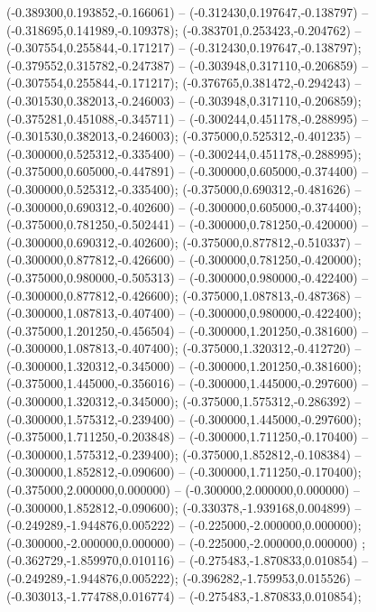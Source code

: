  (-0.389300,0.193852,-0.166061) -- (-0.312430,0.197647,-0.138797) -- (-0.318695,0.141989,-0.109378);
 (-0.383701,0.253423,-0.204762) -- (-0.307554,0.255844,-0.171217) -- (-0.312430,0.197647,-0.138797);
 (-0.379552,0.315782,-0.247387) -- (-0.303948,0.317110,-0.206859) -- (-0.307554,0.255844,-0.171217);
 (-0.376765,0.381472,-0.294243) -- (-0.301530,0.382013,-0.246003) -- (-0.303948,0.317110,-0.206859);
 (-0.375281,0.451088,-0.345711) -- (-0.300244,0.451178,-0.288995) -- (-0.301530,0.382013,-0.246003);
 (-0.375000,0.525312,-0.401235) -- (-0.300000,0.525312,-0.335400) -- (-0.300244,0.451178,-0.288995);
 (-0.375000,0.605000,-0.447891) -- (-0.300000,0.605000,-0.374400) -- (-0.300000,0.525312,-0.335400);
 (-0.375000,0.690312,-0.481626) -- (-0.300000,0.690312,-0.402600) -- (-0.300000,0.605000,-0.374400);
 (-0.375000,0.781250,-0.502441) -- (-0.300000,0.781250,-0.420000) -- (-0.300000,0.690312,-0.402600);
 (-0.375000,0.877812,-0.510337) -- (-0.300000,0.877812,-0.426600) -- (-0.300000,0.781250,-0.420000);
 (-0.375000,0.980000,-0.505313) -- (-0.300000,0.980000,-0.422400) -- (-0.300000,0.877812,-0.426600);
 (-0.375000,1.087813,-0.487368) -- (-0.300000,1.087813,-0.407400) -- (-0.300000,0.980000,-0.422400);
 (-0.375000,1.201250,-0.456504) -- (-0.300000,1.201250,-0.381600) -- (-0.300000,1.087813,-0.407400);
 (-0.375000,1.320312,-0.412720) -- (-0.300000,1.320312,-0.345000) -- (-0.300000,1.201250,-0.381600);
 (-0.375000,1.445000,-0.356016) -- (-0.300000,1.445000,-0.297600) -- (-0.300000,1.320312,-0.345000);
 (-0.375000,1.575312,-0.286392) -- (-0.300000,1.575312,-0.239400) -- (-0.300000,1.445000,-0.297600);
 (-0.375000,1.711250,-0.203848) -- (-0.300000,1.711250,-0.170400) -- (-0.300000,1.575312,-0.239400);
 (-0.375000,1.852812,-0.108384) -- (-0.300000,1.852812,-0.090600) -- (-0.300000,1.711250,-0.170400);
 (-0.375000,2.000000,0.000000) -- (-0.300000,2.000000,0.000000) -- (-0.300000,1.852812,-0.090600);
 (-0.330378,-1.939168,0.004899) -- (-0.249289,-1.944876,0.005222) -- (-0.225000,-2.000000,0.000000);
 (-0.300000,-2.000000,0.000000) -- (-0.225000,-2.000000,0.000000) ;
 (-0.362729,-1.859970,0.010116) -- (-0.275483,-1.870833,0.010854) -- (-0.249289,-1.944876,0.005222);
 (-0.396282,-1.759953,0.015526) -- (-0.303013,-1.774788,0.016774) -- (-0.275483,-1.870833,0.010854);
